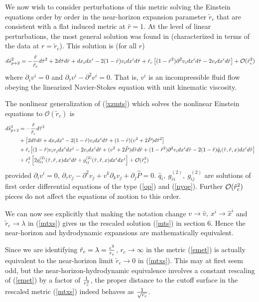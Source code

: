 \documentclass{article}
\def\beq{\begin{equation}}
\def\eeq{\end{equation}}
\def\p{\partial}
\def\t{{ \theta}}
\def\e{{\epsilon}}
\def\cO{\mathcal{O}}
\def\x{\hat x}
\def\P{\hat P}
\def\q{\hat q}
\def\r{\hat r}
\def\t{\hat \tau}
\begin{document}
We now wish to consider perturbations of this metric solving the Einstein equations order by order in the near-horizon expansion parameter $\tilde r_c$ that are  consistent with a flat induced metric at
$\r=1$. At the level of linear perturbations, the most general solution was found in \cite{bkls} (characterized in terms of the data at $r=\tilde r_c$).
This solution is (for all $r$)
%
\beq\label{xzmts}
d\hat s_{p+2}^2 =-{\r \over \tilde r_c} d\t^2 +2d\t d\r + dx_i dx^i-2 (1-\r)v_i dx^i d\t   + \tilde r_c \left[(1-\r^2) \p^2  v_i dx^i d\t-2   { v_i}dx^i d\r \right]+ {\cal O}(\tilde r_c^2)
\eeq
%
where $\p_iv^i=0$ and $\p_{\t } v^i- \p^2 v^i=0$. That is, $v^i$ is an incompressible fluid flow obeying the linearized Navier-Stokes equation with unit kinematic viscosity.

The nonlinear generalization of (\ref{xzmts}) which solves the nonlinear Einstein equations to
$\cO(\tilde r_c)$ is
%
\begin{align}
d\hat s_{p+2}^2&=-{\r \over \tilde r_c} d\t^2\notag\\
&+\bigl[2d\t d\r + dx_i dx^i-2 (1-\r) v_i dx^i d\t +{(1-\r)} (  v^2+2\P) d\t^2 \bigr]  \notag\\
&+\tilde r_c\bigl[(1-\r){ v_i  v_j }dx^i dx^j   -2 { v_i}dx^i d\r + ( v^2+2\P)d\t d\r +(1-\r^2) \p^2  v_i dx^i d\t-2 (1-\r) \q_i(\t,\r,x) dx^i d\t\bigr] \notag\\
&+ \tilde r_c^2 \left[ 2 g_{{\r}i}^{(2)}(\t,\r,x) dx^i d\r + g_{ij}^{(2)}(\t,\r,x) dx^i dx^j \right] + {\cal O}(\tilde r_c^2)\label{mtxs}
\end{align}
%
provided $ \p_iv^i=0$, $ \p_{\t} v_j- \p^2 v_j+ v^k \p_k v_j+  \p_j \P =0$.   $\q_i,~ g_{{\r}i}^{(2)},~g_{ij}^{(2)}$ are solutions of  first order differential equations of the type (\ref{op}) and (\ref{nyqe}). Further ${\cal O}(\tilde r_c^2)$ pieces do not affect the equations of motion to this order.

We can now see explicitly that making the notation change $v\to \hat v, ~x^i\to\x^i$ and $\tilde r_c \to \lambda$
in (\ref{mtxs}) gives us the rescaled solution (\ref{mts}) in section 6. Hence the near-horizon and hydrodynamic expansions are mathematically equivalent.

Since we are identifying $\tilde r_c=\lambda={\e^2\over r_c}$, $r_c\to \infty$ in the metric (\ref{emet}) is actually equivalent to the  near-horizon limit $\tilde r_c\to 0$ in (\ref{mtxs}).  This may at first seem odd, but the near-horizon-hydrodynamic equivalence involves a constant rescaling of (\ref{emet}) by a factor of ${1 \over r_c^2}$, the proper distance to the cutoff surface in the rescaled metric (\ref{mtxs}) indeed behaves as  $1 \over \sqrt{r_c}$.
\end{document}
